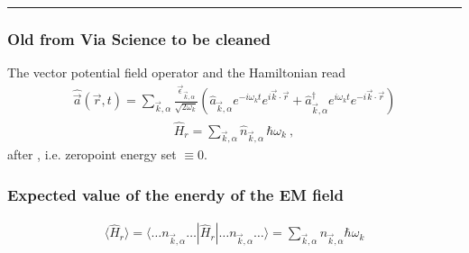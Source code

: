 \documentclass[letterpaper,10pt,english]{jupyterBook}
\begin{document}
\bigskip\hrule\bigskip

\subsubsection*{Old \sphinxhyphen{} from Via Science \sphinxhyphen{} to be cleaned}

\sphinxAtStartPar
{} The vector potential field operator and the Hamiltonian read
\begin{equation*}
\begin{split}
\hat{\vec{a}}(\vec{r}, t) = \sum_{\vec k,\alpha}\frac{\vec{\epsilon}_{\vec k,\alpha}}{\sqrt{2\omega_k}}\left(\hat a_{\vec k,\alpha}e^{-i\omega_kt}e^{i\vec k\cdot\vec r}+\hat a^\dagger_{\vec k,\alpha}e^{i\omega_kt}e^{-i\vec k\cdot\vec r}\right)
\end{split}
\end{equation*}\begin{equation*}
\begin{split}
\hat H_r=\sum_{\vec k,\alpha}\hat n_{\vec k,\alpha}\,\hbar\omega_k \ ,
\end{split}
\end{equation*}
\sphinxAtStartPar
after , i.e. zero\sphinxhyphen{}point energy set \(\equiv0\).
\subsubsection*{Expected value of the enerdy of the EM field}
\begin{equation*}
\begin{split}
\langle\hat H_r\rangle=\langle\dots n_{\vec k,\alpha}\dots|\hat H_r|\dots n_{\vec k,\alpha}\dots\rangle=\sum_{\vec k,\alpha}n_{\vec k,\alpha}\hbar\omega_k
\end{split}
\end{equation*}
\end{document}
